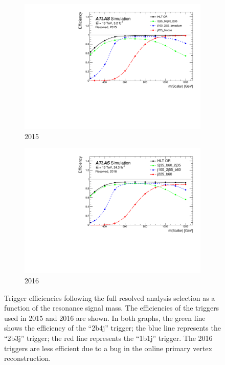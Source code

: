 \begin{figure}[htbp!]
\centering
\captionsetup{justification=centering}
	\hspace{-3cm}
    \begin{subfigure}[b]{0.28\textwidth}
        \includegraphics[width=\textwidth,angle=-90]{figures/resolved/extra_plots/trigEff_2015_NWS_passSignal_HLT}
        \caption{2015}
        \label{fig:data_restrig_2015}
    \end{subfigure}
    \quad \quad \quad \quad \quad \quad
    \begin{subfigure}[b]{0.28\textwidth}
        \includegraphics[width=\textwidth,angle=-90]{figures/resolved/extra_plots/trigEff_2016_NWS_passSignal_HLT}
        \caption{2016}
        \label{fig:data_restrig_2015}
    \end{subfigure}
\caption{Trigger efficiencies following the full resolved analysis selection as a function of the resonance signal mass. The efficiencies of the triggers used in 2015 and 2016 are shown. In both graphs, the green line shows the efficiency of the ``2b4j'' trigger; the blue line represents the ``2b3j'' trigger; the red line represents the ``1b1j'' trigger. The 2016 triggers are less efficient due to a bug in the online primary vertex reconstruction.}
\label{fig:data_restrig}
\end{figure}

